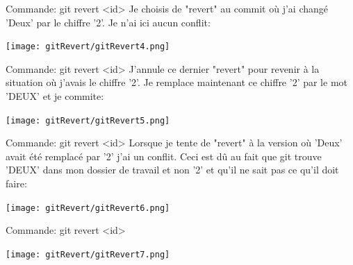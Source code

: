 \documentclass{beamer}
\begin{document}
\begin{frame}{Commande: git revert <id>}
Je choisis de "revert" au commit où j'ai changé 'Deux' par le chiffre '2'. Je n'ai ici aucun conflit:
\begin{center}
	\texttt{[image: gitRevert/gitRevert4.png]}
\end{center}
\end{frame}

\begin{frame}{Commande: git revert <id>}
J'annule ce dernier "revert" pour revenir à la situation où j'avais le chiffre '2'. Je remplace maintenant ce chiffre '2' par le mot 'DEUX' et je commite:
\begin{center}
	\texttt{[image: gitRevert/gitRevert5.png]}
\end{center}
\end{frame}

\begin{frame}{Commande: git revert <id>}
Lorsque je tente de "revert" à la version où 'Deux' avait été remplacé par '2' j'ai un conflit. Ceci est dû au fait que git trouve 'DEUX' dans mon dossier de travail et non '2' et qu'il ne sait pas ce qu'il doit faire:
\begin{center}
	\texttt{[image: gitRevert/gitRevert6.png]}
\end{center}
\end{frame}

\begin{frame}{Commande: git revert <id>}

\begin{center}
	\texttt{[image: gitRevert/gitRevert7.png]}
\end{center}
\end{frame}
\end{document}
